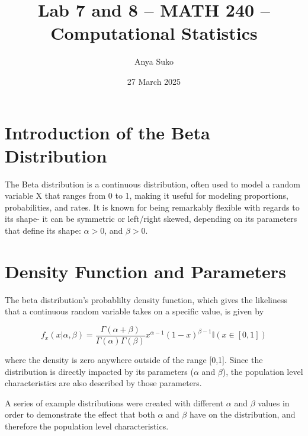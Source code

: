 \documentclass{article}\usepackage[]{graphicx}\usepackage[]{xcolor}
\begin{document}
\vspace{-1in}
\title{Lab 7 and 8 -- MATH 240 -- Computational Statistics}

\author{
  Anya Suko\\
}

\date{27 March 2025}

\maketitle

\begin{multicols}{2}
\section{Introduction of the Beta Distribution}

The Beta distribution is a continuous distribution, often used to model a random variable X that ranges from 0 to 1, making it useful for modeling proportions, probabilities, and rates. It is known for being remarkably flexible with regards to its shape- it can be symmetric or left/right skewed, depending on its parameters that define its shape: $\alpha > 0$, and $\beta > 0$.
 

\section{Density Function and Parameters}
The beta distribution's probablilty density function, which gives the likeliness that a continuous random variable takes on a specific value, is given by

\[
f_x(x | \alpha, \beta) = \frac{\Gamma(\alpha + \beta)}{\Gamma(\alpha)\Gamma(\beta)}
x^{\alpha-1}(1-x)^{\beta -1} \mathbb{I}(x \in [0,1])
\]

where the density is zero anywhere outside of the range [0,1]. Since the distribution is directly impacted by its parameters ($\alpha$ and $\beta$), the population level characteristics are also described by those parameters. 

A series of example distributions were created with different $\alpha$ and $\beta$ values in order to demonstrate the effect that both $\alpha$ and $\beta$ have on the distribution, and therefore the population level characteristics.



\end{multicols}
\end{document}
